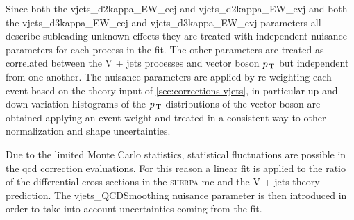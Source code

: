 Since both the vjets\_d2kappa\_EW\_eej and vjets\_d2kappa\_EW\_evj and both the
vjets\_d3kappa\_EW\_eej and vjets\_d3kappa\_EW\_evj parameters all describe
subleading unknown effects they are treated with independent nuisance parameters
for each process in the fit. The other parameters are treated as correlated
between the V + jets processes and vector boson $p_\mathrm{\, T}$ but independent from one
another. The nuisance parameters are applied by re-weighting each event based on
the theory input of \cref{sec:corrections-vjets}, in particular up and down
variation histograms of the $p_\mathrm{\, T}$ distributions of the vector boson are obtained
applying an event weight and treated in a consistent way to other normalization
and shape uncertainties.

Due to the limited Monte Carlo statistics, statistical fluctuations are possible
in the \gls{qcd} correction evaluations. For this reason a linear fit is applied
to the ratio of the differential cross sections in the \textsc{sherpa} \gls{mc}
and the V + jets theory prediction. The vjets\_QCDSmoothing nuisance parameter
is then introduced in order to take into account uncertainties coming from the
fit.
